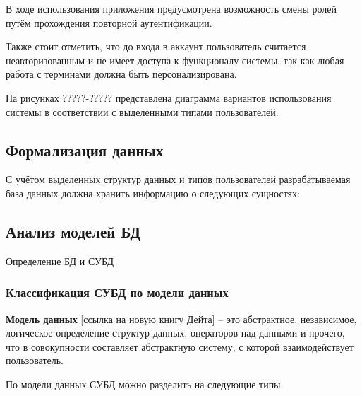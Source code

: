В ходе использования приложения предусмотрена возможность смены ролей путём прохождения повторной аутентификации.

Также стоит отметить, что до входа в аккаунт пользователь считается неавторизованным и не имеет доступа к функционалу системы, так как любая работа с терминами должна быть персонализирована.

На рисунках ?????-????? представлена диаграмма вариантов использования системы в соответствии с выделенными типами пользователей.



\subsection{Формализация данных}

С учётом выделенных структур данных и типов пользователей разрабатываемая база данных должна хранить информацию о следующих сущностях:



\subsection{Анализ моделей БД}

Определение БД и СУБД

\subsubsection{Классификация СУБД по модели данных}

\textbf{Модель данных} [ссылка на новую книгу Дейта] – это абстрактное, независимое, логическое определение структур
данных, операторов над данными и прочего, что в совокупности составляет абстрактную систему, с которой взаимодействует пользователь.

По модели данных СУБД можно разделить на следующие типы.



